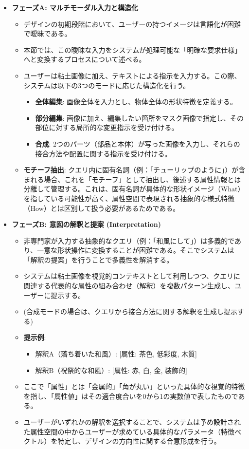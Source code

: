 \documentclass[dvipdfmx]{jlreq}
\begin{document}
\begin{itemize}
  \item \textbf{フェーズA: マルチモーダル入力と構造化}
  \begin{itemize}
    \item デザインの初期段階において、ユーザーの持つイメージは言語化が困難で曖昧である。
    \item 本節では、この曖昧な入力をシステムが処理可能な「明確な要求仕様」へと変換するプロセスについて述べる。
    \item ユーザーは粘土画像に加え、テキストによる指示を入力する。この際、システムは以下の3つのモードに応じた構造化を行う。
    \begin{itemize}
      \item \textbf{全体編集}: 画像全体を入力とし、物体全体の形状特徴を定義する。
      \item \textbf{部分編集}: 画像に加え、編集したい箇所をマスク画像で指定し、その部位に対する局所的な変更指示を受け付ける。
      \item \textbf{合成}: 2つのパーツ（部品と本体）が写った画像を入力し、それらの接合方法や配置に関する指示を受け付ける。
    \end{itemize}
    \item \textbf{モチーフ抽出}: クエリ内に固有名詞（例：「チューリップのように」）が含まれる場合、これを「モチーフ」として抽出し、後述する属性情報とは分離して管理する。これは、固有名詞が具体的な形状イメージ（What）を指している可能性が高く、属性空間で表現される抽象的な様式特徴（How）とは区別して扱う必要があるためである。
  \end{itemize}

  \item \textbf{フェーズB: 意図の解釈と提案 (Interpretation)}
  \begin{itemize}
    \item 非専門家が入力する抽象的なクエリ（例：「和風にして」）は多義的であり、一意な形状操作に変換することが困難である。そこでシステムは「解釈の提案」を行うことで多義性を解消する。
    \item システムは粘土画像を視覚的コンテキストとして利用しつつ、クエリに関連する代表的な属性の組み合わせ（解釈）を複数パターン生成し、ユーザーに提示する。
    \item (合成モードの場合は、クエリから接合方法に関する解釈を生成し提示する)
    \item \textbf{提示例}:
    \begin{itemize}
      \item 解釈A（落ち着いた和風）: [属性: 茶色, 低彩度, 木質]
      \item 解釈B（祝祭的な和風）: [属性: 赤, 白, 金, 装飾的]
    \end{itemize}
    \item ここで「属性」とは「金属的」「角が丸い」といった具体的な視覚的特徴を指し、「属性値」はその適合度合いを0から1の実数値で表したものである。
    \item ユーザーがいずれかの解釈を選択することで、システムは予め設計された属性空間の中からユーザーが求めている具体的なパラメータ（特徴ベクトル）を特定し、デザインの方向性に関する合意形成を行う。
  \end{itemize}
\end{itemize}
\end{document}
